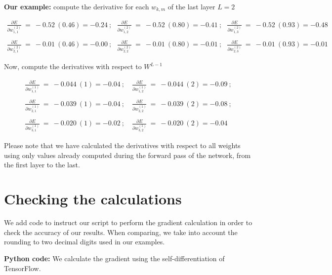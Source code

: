 \documentclass{article}
\begin{document}
\textbf{Our example:}  compute the derivative for each  $w_{k,m}$ of the last layer $L=2$


{\small
\begin{gather*}
\frac{\partial E}{\partial w_{1,1}^{( 2)}} \ =\ -0.52\ ( 0.46 ) = -0.24 \ ;\ \ \
\frac{\partial E}{\partial w_{1,2}^{( 2)}} \ =\ -0.52\ ( 0.80 ) = -0.41 \ ;\ \ \
\frac{\partial E}{\partial w_{1,3}^{( 2)}} \ =\ -0.52\ ( 0.93 ) = -0.48 \\
\\
\frac{\partial E}{\partial w_{2,1}^{( 2)}} \ =\ -0.01\ ( 0.46 ) = -0.00 \ ;\ \ \
\frac{\partial E}{\partial w_{2,2}^{( 2)}} \ =\ -0.01\ ( 0.80 ) = -0.01 \ ;\ \ \
\frac{\partial E}{\partial w_{2,3}^{( 2)}} \ =\ -0.01\ ( 0.93 ) = -0.01
\end{gather*}
}


Now, compute the derivatives with respect to $W^{L-1}$


{\small
\begin{gather*}
\frac{\partial E}{\partial w_{1,1}^{( 1)}} \ =\ -0.044\ ( 1 ) = -0.04 \ ;\quad
\frac{\partial E}{\partial w_{1,2}^{( 1)}} \ =\ -0.044\ ( 2 ) = -0.09 \ ;\\
\\
\frac{\partial E}{\partial w_{2,1}^{( 1)}} \ =\ -0.039\ ( 1 ) = -0.04 \ ;\quad
\frac{\partial E}{\partial w_{2,2}^{( 1)}} \ =\ -0.039\ ( 2 ) = -0.08 \ ;\\
\\
\frac{\partial E}{\partial w_{3,1}^{( 1)}} \ =\ -0.020\ ( 1 ) = -0.02 \ ;\quad
\frac{\partial E}{\partial w_{3,2}^{( 1)}} \ =\ -0.020\ ( 2 ) = -0.04
\end{gather*}
}

 Please note that we have calculated the derivatives with respect to all weights using only values already computed during the forward pass of the network, from the first layer to the last.

\section{Checking the calculations}

We add code to instruct our script to perform the gradient calculation in order to check the accuracy of our results. When comparing, we take into account the rounding to two decimal digits used in our examples.


\textbf{Python code:} We calculate the gradient using the self-differentiation of TensorFlow.
\end{document}

